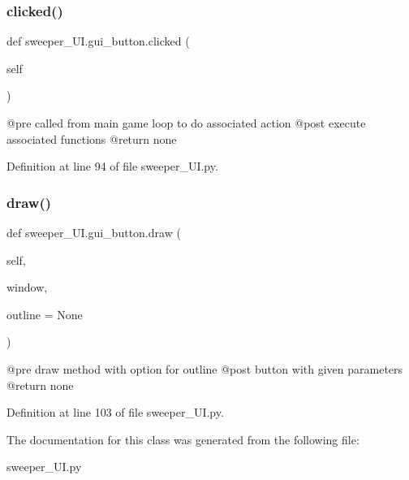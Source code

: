 \subsubsection{\texorpdfstring{clicked()}{clicked()}}
{\footnotesize\ttfamily def sweeper\+\_\+\+U\+I.\+gui\+\_\+button.\+clicked (\begin{DoxyParamCaption}\item[{}]{self }\end{DoxyParamCaption})}

\begin{DoxyVerb}@pre called from main game loop to do associated action
@post execute associated functions
@return none
\end{DoxyVerb}
 

Definition at line 94 of file sweeper\+\_\+\+U\+I.\+py.

\mbox{\label{classsweeper___u_i_1_1gui__button_ae168198450518f00782017759a8879bd}} 
\subsubsection{\texorpdfstring{draw()}{draw()}}
{\footnotesize\ttfamily def sweeper\+\_\+\+U\+I.\+gui\+\_\+button.\+draw (\begin{DoxyParamCaption}\item[{}]{self,  }\item[{}]{window,  }\item[{}]{outline = {\ttfamily None} }\end{DoxyParamCaption})}

\begin{DoxyVerb}@pre draw method with option for outline
@post button with given parameters
@return none
\end{DoxyVerb}
 

Definition at line 103 of file sweeper\+\_\+\+U\+I.\+py.



The documentation for this class was generated from the following file\+:\begin{DoxyCompactItemize}
\item 
sweeper\+\_\+\+U\+I.\+py\end{DoxyCompactItemize}
